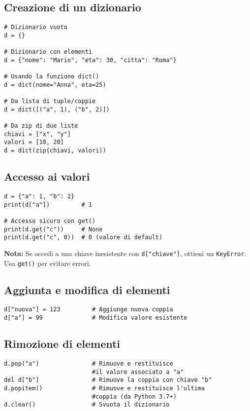 \documentclass[a4paper,12pt]{article}
\begin{document}
\subsection*{Creazione di un dizionario}
\begin{lstlisting}
# Dizionario vuoto
d = {}

# Dizionario con elementi
d = {"nome": "Mario", "eta": 30, "citta": "Roma"}

# Usando la funzione dict()
d = dict(nome="Anna", eta=25)

# Da lista di tuple/coppie
d = dict([("a", 1), ("b", 2)])

# Da zip di due liste
chiavi = ["x", "y"]
valori = [10, 20]
d = dict(zip(chiavi, valori))
\end{lstlisting}

\subsection*{Accesso ai valori}
\begin{lstlisting}
d = {"a": 1, "b": 2}
print(d["a"])         # 1

# Accesso sicuro con get()
print(d.get("c"))     # None
print(d.get("c", 0))  # 0 (valore di default)
\end{lstlisting}

\textbf{Nota:} Se accedi a una chiave inesistente con \texttt{d["chiave"]}, ottieni un \texttt{KeyError}. Usa \texttt{get()} per evitare errori.

\subsection*{Aggiunta e modifica di elementi}
\begin{lstlisting}
d["nuova"] = 123         # Aggiunge nuova coppia
d["a"] = 99              # Modifica valore esistente
\end{lstlisting}

\subsection*{Rimozione di elementi}
\begin{lstlisting}
d.pop("a")               # Rimuove e restituisce
                         #il valore associato a "a"
del d["b"]               # Rimuove la coppia con chiave "b"
d.popitem()              # Rimuove e restituisce l'ultima
                         #coppia (da Python 3.7+)
d.clear()                # Svuota il dizionario
\end{lstlisting}
\end{document}
